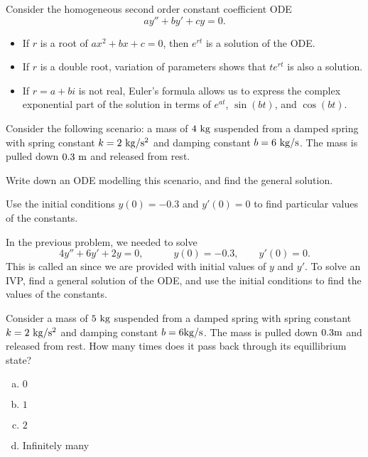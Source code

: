 
\begin{applicationActivities}

\begin{observation}
Consider the homogeneous second order constant coefficient ODE \[ay''+by'+cy=0.\]
\vfill
\begin{itemize}
\item If \(r\) is a root of \(ax^2+bx+c=0\), then \(e^{rt}\) is a solution of the ODE.
\item If \(r\) is a double root, variation of parameters shows that \(te^{rt}\) is also a solution.
\item If \(r=a+bi\) is not real, Euler's formula allows us to express the complex exponential part of the solution in terms of \(e^{at}\), \(\sin(bt)\), and \(\cos(bt)\).
\end{itemize}
\end{observation}

\begin{activity}{15}
Consider the following scenario:  a mass of \(4\ {\rm kg}\) suspended from a damped spring with spring constant \(k=2\ {\rm kg/s^2}\) and damping constant \(b= 6\ {\rm kg/s}\).  
\vfill
The mass is pulled down \(0.3\ {\rm m}\) and released from rest.  
\begin{subactivity}
Write down an ODE modelling this scenario, and find the general solution.
\end{subactivity}
\begin{subactivity}
Use the initial conditions \(y(0)=-0.3\) and \(y'(0)=0\) to find particular values of the constants.
\end{subactivity}
\end{activity}

\begin{definition}
In the previous problem, we needed to solve
\[ 4y''+6y'+2y = 0, \hspace{3em} y(0)=-0.3, \hspace{2em} y'(0)=0 .\]
This is called an  since we are provided with initial values of \(y\) and \(y'\).
\vfill
To solve an IVP, find a general solution of the ODE, and use the initial conditions to find the values of the constants.
\end{definition}

\begin{activity}{15}
Consider a mass of \(5\ {\rm kg}\) suspended from a damped spring with spring constant \(k=2\ {\rm kg/s^2}\) and damping constant \(b= 6{\rm kg/s}\).  
\vfill
The mass is pulled down \(0.3 {\rm m}\) and released from rest.  How many times does it pass back through its equillibrium state?
\vfill
\begin{enumerate}[(a)]
\item \(0\)
\item \(1\)
\item \(2\)
\item Infinitely many
\end{enumerate}
\end{activity}


\end{applicationActivities}

